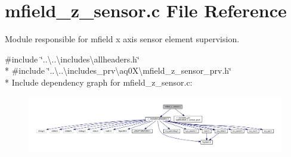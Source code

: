\hypertarget{a00053}{\section{mfield\+\_\+z\+\_\+sensor.\+c File Reference}
\label{a00053}
}


Module responsible for mfield x axis sensor element supervision.  


{\ttfamily \#include \char`\"{}..\textbackslash{}..\textbackslash{}includes\textbackslash{}allheaders.\+h\char`\"{}}\\*
{\ttfamily \#include \char`\"{}..\textbackslash{}..\textbackslash{}includes\+\_\+prv\textbackslash{}aq0\+X\textbackslash{}mfield\+\_\+z\+\_\+sensor\+\_\+prv.\+h\char`\"{}}\\*
Include dependency graph for mfield\+\_\+z\+\_\+sensor.\+c\+:\nopagebreak
\begin{figure}[H]
\begin{center}
\leavevmode
\includegraphics[width=350pt]{d7/dfd/a00969}
\end{center}
\end{figure}
